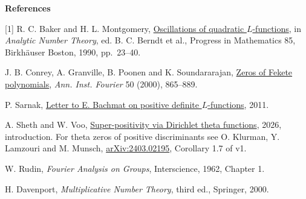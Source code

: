 \documentclass[11pt]{article}
\begin{document}
\textbf{References}\par
{\small\raggedright
[1] R. C. Baker and H. L. Montgomery, \href{https://doi.org/10.1007/978-1-4612-3464-7_3}{Oscillations of quadratic $L$-functions}, in \emph{Analytic Number Theory}, ed. B. C. Berndt et al., Progress in Mathematics 85, Birkh\"auser Boston, 1990, pp.~23--40.\par
[2] J. B. Conrey, A. Granville, B. Poonen and K. Soundararajan, \href{https://doi.org/10.5802/aif.1776}{Zeros of Fekete polynomials}, \emph{Ann. Inst. Fourier} 50 (2000), 865--889.\par
[3] P. Sarnak, \href{https://publications.ias.edu/sarnak/paper/511}{Letter to E. Bachmat on positive definite $L$-functions}, 2011.\par
[4] A. Sheth and W. Voo, \href{https://arxiv.org/abs/2611.12152}{Super-positivity via Dirichlet theta functions}, 2026, introduction. For theta zeros of positive discriminants see O. Klurman, Y. Lamzouri and M. Munsch, \href{https://arxiv.org/abs/2403.02195}{arXiv:2403.02195}, Corollary 1.7 of v1.\par
[5] W. Rudin, \emph{Fourier Analysis on Groups}, Interscience, 1962, Chapter 1.\par
[6] H. Davenport, \emph{Multiplicative Number Theory}, third ed., Springer, 2000.\par}
\end{document}
